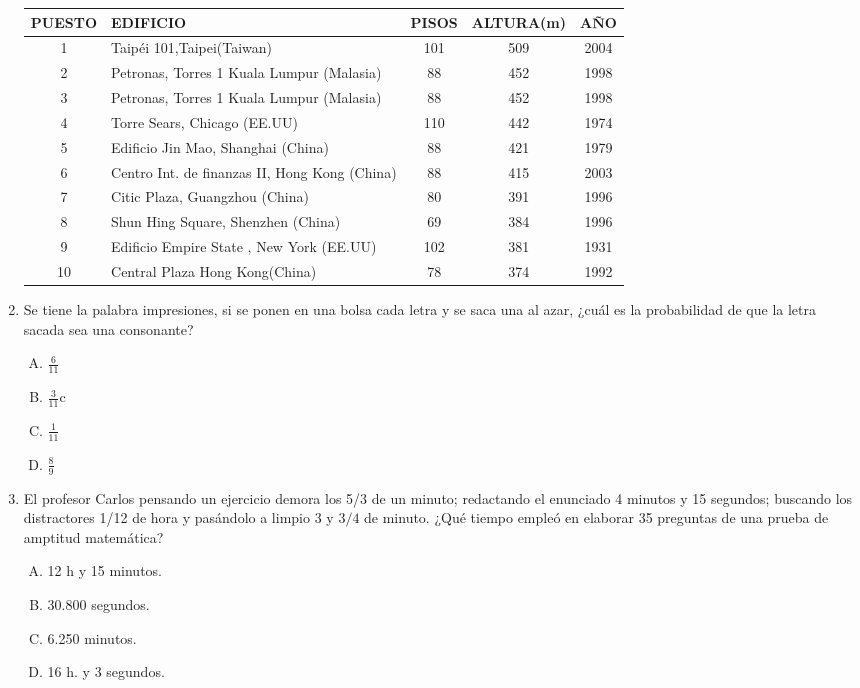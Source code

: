 \begin{enumerate}
\begin{center}
\begin{table*}[htp]
\begin{tabular}{|c|p{8.5cm}ccc|}
\hline 
PUESTO	&EDIFICIO	&PISOS	&ALTURA(m)	&AÑO\\
\hline \hline 
1	&Taipéi 101,Taipei(Taiwan)	&101	&509	&2004\\
2	&Petronas, Torres 1 Kuala Lumpur (Malasia)	&88	&452	&1998\\
3	&Petronas, Torres 1 Kuala Lumpur (Malasia)	&88	&452	&1998\\
4	&Torre Sears, Chicago (EE.UU)	&110	&442	&1974\\
5	&Edificio Jin Mao, Shanghai (China)	&88	&421	&1979\\
6	&Centro Int. de finanzas II, Hong Kong (China)	&88	&415	&2003\\
7	&Citic Plaza, Guangzhou (China)	&80	&391	&1996\\
8	&Shun Hing Square, Shenzhen (China)	&69	&384	&1996\\
9	&Edificio Empire State , New York (EE.UU)	&102	&381	&1931\\
10	&Central Plaza Hong Kong(China)	&78	&374	&1992\\
\hline 
\end{tabular} 

\end{table*}

\end{center}

\newpage


\item Se tiene la palabra impresiones, si se ponen en una bolsa cada letra y se saca una al azar, ¿cuál es la probabilidad de que la letra sacada sea una consonante? \label{vic-4} 
\begin{enumerate}[(A)]
\item $\frac{6}{11}$
\item $\frac{3}{11}$c
\item $\frac{1}{11}$
\item $\frac{8}{9}$
\end{enumerate}
\item El profesor Carlos pensando un ejercicio demora los 5/3 de un minuto; redactando el enunciado 4 minutos y 15 segundos; buscando los distractores 1/12 de hora y pasándolo a limpio 3 y $3/4$ de minuto.  ¿Qué tiempo empleó en elaborar 35 preguntas de una prueba de amptitud  matemática?\label{anexo_1}\label{vic-5}
\begin{enumerate}[(A)]
\item 12 h y 15 minutos.
\item 30.800 segundos.
\item 6.250 minutos.
\item 16 h. y 3 segundos.
\end{enumerate}




\end{enumerate}
